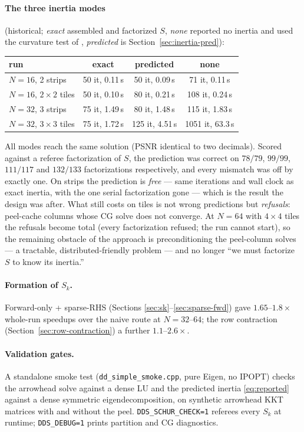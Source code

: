 \documentclass[11pt]{article}
\newcommand{\code}[1]{\texttt{#1}}
\begin{document}
\paragraph{The three inertia modes} (historical; \emph{exact} assembled and
factorized $S$, \emph{none} reported no inertia and used the curvature test
of \cite{chiang2016inertia}, \emph{predicted} is Section~\ref{sec:inertia-pred}):
\begin{center}
\begin{tabular}{lccc}
\toprule
run & exact & predicted & none\\
\midrule
$N=16$, 2 strips        & 50 it, 0.11\,s & 50 it, 0.09\,s & 71 it, 0.11\,s\\
$N=16$, $2\times2$ tiles & 50 it, 0.10\,s & 80 it, 0.21\,s & 108 it, 0.24\,s\\
$N=32$, 3 strips        & 75 it, 1.49\,s & 80 it, 1.48\,s & 115 it, 1.83\,s\\
$N=32$, $3\times3$ tiles & 75 it, 1.72\,s & 125 it, 4.51\,s & 1051 it, 63.3\,s\\
\bottomrule
\end{tabular}
\end{center}
All modes reach the same solution (PSNR identical to two decimals).  Scored
against a referee factorization of $S$, the prediction was correct on
$78/79$, $99/99$, $111/117$ and $132/133$ factorizations respectively, and
every mismatch was off by exactly one.  On strips the prediction is
\emph{free} --- same iterations and wall clock as exact inertia, with the one
serial factorization gone --- which is the result the design was after.  What
still costs on tiles is not wrong predictions but \emph{refusals}: peel-cache
columns whose CG solve does not converge.  At $N=64$ with $4\times4$ tiles the
refusals become total (every factorization refused; the run cannot start), so
the remaining obstacle of the approach is preconditioning the peel-column
solves --- a tractable, distributed-friendly problem --- and no longer ``we
must factorize $S$ to know its inertia.''

\paragraph{Formation of $S_k$.}  Forward-only + sparse-RHS
(Sections \ref{sec:sk}--\ref{sec:sparse-fwd}) gave $1.65$--$1.8\times$
whole-run speedups over the naive route at $N=32$--$64$; the row contraction
(Section~\ref{sec:row-contraction}) a further $1.1$--$2.6\times$.

\paragraph{Validation gates.}  A standalone smoke test
(\code{dd\_simple\_smoke.cpp}, pure Eigen, no IPOPT) checks the arrowhead
solve against a dense LU and the predicted inertia \eqref{eq:reported}
against a dense symmetric eigendecomposition, on synthetic arrowhead KKT
matrices with and without the peel.  \code{DDS\_SCHUR\_CHECK=1} referees
every $S_k$ at runtime; \code{DDS\_DEBUG=1} prints partition and CG
diagnostics.
\end{document}
